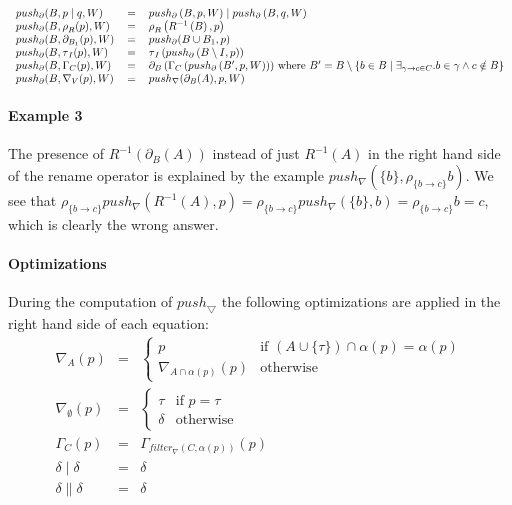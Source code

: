 \documentclass{article}
\begin{document}
\[\begin{tabular}{lll}
$push_{\partial }(B,p\mid q,W)$ & $=$ & $push_{\partial }\left( B,p,W\right)
\mid push_{\partial }\left( B,q,W\right) $ \\ 
$push_{\partial }(B,\rho _{R}(p),W)$ & $=$ & $\rho _{R}\left( R^{-1}\left(
B\right) ,p\right) $ \\ 
$push_{\partial }(B,\partial _{B_{1}}(p),W)$ & $=$ & $push_{\partial }(B\cup
B_{1},p)$ \\ 
$push_{\partial }(B,\tau _{I}(p),W)$ & $=$ & $\tau _{I}\left( push_{\partial
}\left( B\setminus I,p\right) \right) $ \\ 
$push_{\partial }(B,\Gamma _{C}(p),W)$ & $=$ & $\partial _{B}\left( \Gamma
_{C}\left( push_{\partial }\left( B^{\prime },p,W\right) \right) \right) $
where $B^{\prime }=B\setminus \left\{ b\in B\mid \exists _{\gamma
\rightarrow c\in C}.b\in \gamma \wedge c\notin B\right\} $ \\ 
$push_{\partial }(B,\nabla _{V}(p),W)$ & $=$ & $push_{\nabla }(\partial
_{B}(A),p,W)$%
\end{tabular}%
\]

\paragraph{Example 3}

The presence of $R^{-1}(\partial _{B}(A))$ instead of just $R^{-1}(A)$ in
the right hand side of the rename operator is explained by the example $%
push_{\nabla }(\{b\},\rho _{\{b\rightarrow c\}}b)$. We see that $\rho
_{\{b\rightarrow c\}}push_{\nabla }(R^{-1}(A),p)=\rho _{\{b\rightarrow
c\}}push_{\nabla }(\{b\},b)=\rho _{\{b\rightarrow c\}}b=c$, which is clearly
the wrong answer.

\paragraph{Optimizations}

During the computation of $push_{\bigtriangledown }$ the following
optimizations are applied in the right hand side of each equation:%
\[
\begin{array}{lll}
\nabla _{A}(p) & = & \left\{ 
\begin{array}{ll}
p & \text{if }(A\cup \{\tau \})\cap \alpha (p)=\alpha (p) \\ 
\nabla _{A\cap \alpha (p)}(p) & \text{otherwise}%
\end{array}%
\right. \\ 
\nabla _{\emptyset }(p) & = & \left\{ 
\begin{array}{ll}
\tau & \text{if }p=\tau \\ 
\delta & \text{otherwise}%
\end{array}%
\right. \\ 
\Gamma _{C}(p) & = & \Gamma _{filter_{\nabla }(C,\alpha (p))}(p) \\ 
\delta \mid \delta & = & \delta \\ 
\delta \parallel \delta & = & \delta%
\end{array}%
\]
\end{document}
